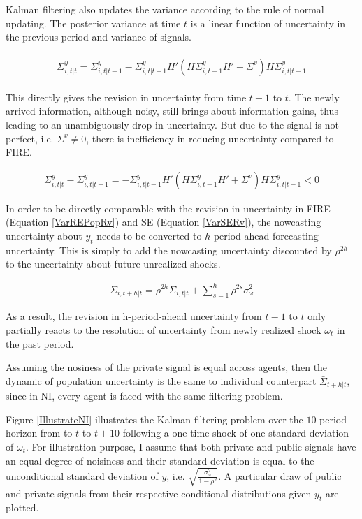 \documentclass[12pt]{article}
\begin{document}
	Kalman filtering also updates the variance according to the rule of normal updating.   The posterior variance at time $t$ is a linear function of uncertainty in the previous period and variance of signals. 
	
	\begin{eqnarray}
		\begin{aligned}
			\Sigma^y_{i,t|t} = \Sigma^y_{i,t|t-1} - \Sigma^y_{i,t|t-1} H'(H \Sigma^y_{i,t-1} H' +\Sigma^v) H \Sigma^y_{i,t|t-1} 
		\end{aligned}
	\end{eqnarray}
	
	This directly gives the revision in uncertainty from time $t-1$ to $t$. The newly arrived information, although noisy, still brings about information gains, thus leading to an unambiguously drop in uncertainty. But due to the signal is not perfect, i.e. $\Sigma^v \neq 0$, there is inefficiency in reducing uncertainty compared to FIRE. 
	
	\begin{eqnarray}\label{VarNIRv}
		\Sigma^y_{i,t|t} - \Sigma^y_{i,t|t-1} = - \Sigma^y_{i,t|t-1} H'(H \Sigma^y_{i,t-1} H' +\Sigma^v) H \Sigma^y_{i,t|t-1} <0
	\end{eqnarray}
	
	In order to be directly comparable with the revision in uncertainty in FIRE (Equation \ref{VarREPopRv}) and SE (Equation \ref{VarSERv}), the nowcasting uncertainty about $y_t$ needs to be converted to $h$-period-ahead forecasting uncertainty. This is simply to add the nowcasting uncertainty discounted by $\rho^{2h}$ to the uncertainty about future unrealized shocks.   
	
	\begin{eqnarray}\label{VarNIEq}
		\Sigma_{i,t+h|t} = \rho^{2h} \Sigma_{i,t|t} + \sum^{h}_{s=1}\rho^{2s} \sigma^2_{\omega}
	\end{eqnarray}
	
	As a result, the revision in h-period-ahead uncertainty from $t-1$ to $t$ only partially reacts to the resolution of uncertainty from newly realized shock $\omega_t$ in the past period. 
	
	Assuming the nosiness of the private signal is equal across agents, then the dynamic of population uncertainty is the same to individual counterpart $\bar \Sigma_{t+h|t}$, since in NI, every agent is faced with the same filtering problem.  
	
	Figure \ref{IllustrateNI} illustrates the Kalman filtering problem over the $10$-period horizon from to $t$ to $t+10$  following a one-time shock of one standard deviation of $\omega_t$.  For illustration purpose, I assume that both private and public signals have an equal degree of noisiness and their standard deviation is equal to the unconditional standard deviation of $y$, i.e. $\sqrt{\frac{\sigma^2_\omega}{1-\rho^2}}$.  A particular draw of public and private signals from their respective conditional distributions given $y_t$ are plotted.    
	
\end{document}
